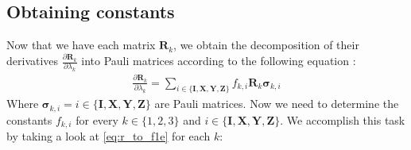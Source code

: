 \documentclass{aux/ttuthes2007}
\newcommand{\fpd}[2]{\frac{\partial #1}{\partial #2}}
\begin{document}
\subsection {\textbf{Obtaining constants}}
%
Now that we have each matrix $\bm R_k$, we obtain the decomposition of their derivatives $\fpd{\bm R_k}{\lambda_k}$ into Pauli matrices according to the following equation \cite{benjamin}:
%
\begin{equation}\label{eq:r_to_f1e}
\begin{split}
	\fpd{\bm R_k}{\lambda_k} = \sum_{i \in \{\bm I, \bm X, \bm Y, \bm Z\}} f_{k, i} \bm R_k \bm \sigma_{k, i}
\end{split}
\end{equation}
%
Where $\bm \sigma_{k, i} = i \in \{\bm I, \bm X, \bm Y, \bm Z\}$ are Pauli matrices.
Now we need to determine the constants $f_{k, i}$ for every $k \in \{1, 2, 3\}$ and $i \in \{\bm I, \bm X, \bm Y, \bm Z\}$. We accomplish this task by taking a look at \ref{eq:r_to_f1e} for each $k$:
%
\end{document}
